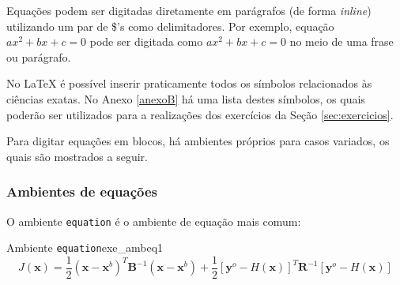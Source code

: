 Equações podem ser digitadas diretamente em parágrafos (de forma \textit{inline}) utilizando um par de \$'s como delimitadores. Por exemplo, equação $ax^2 + bx + c = 0$ pode ser digitada como \texttt{$ax^2 + bx + c = 0$} no meio de uma frase ou parágrafo.

No \LaTeX{} é possível inserir praticamente todos os símbolos relacionados às ciências exatas. No Anexo \ref{anexoB} há uma lista destes símbolos, os quais poderão ser utilizados para a realizações dos exercícios da Seção \ref{sec:exercicios}.

%
%
%

Para digitar equações em blocos, há ambientes próprios para casos variados, os quais são mostrados a seguir.

\subsubsection*{Ambientes de equações}
\label{sec:amb_eqs}

O ambiente \texttt{equation} é o ambiente de equação mais comum:


\begin{texexptitled}[breakable,center lower,enhanced,middle=2mm]{Ambiente \texttt{equation}}{exe_ambeq1}
\begin{equation*}
J(\mathbf{x}) = \frac{1}{2}(\mathbf{x} - \mathbf{x}^{b})^{T}\mathbf{B}^{-1}(\mathbf{x} - \mathbf{x}^{b}) + \frac{1}{2}[\mathbf{y}^{o} - \textit{H}(\mathbf{x})]^{T}\mathbf{R}^{-1}[\mathbf{y}^{o} - \textit{H}(\mathbf{x})]
\end{equation*}
\end{texexptitled}

